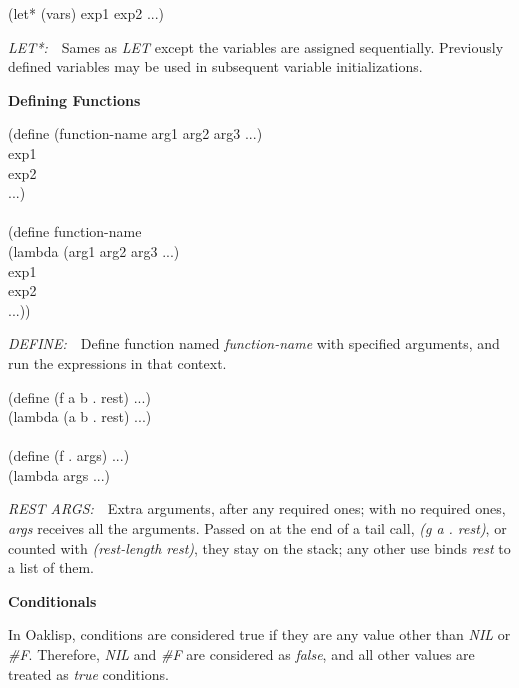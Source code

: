 \documentclass[12pt]{article}
\begin{document}
\parbox[t]{3.4in}{
(let* (vars)  exp1 exp2 ...)
}\parbox[t]{3.5in}{
 \emph{LET*:}\ \ Sames as \emph{LET} except the variables are assigned sequentially.  Previously defined variables may be used in subsequent variable initializations.
}


\newpage

{\Large \bfseries Defining Functions}

\bigskip


\parbox[t]{3.4in}{
(define (function-name arg1 arg2 arg3 ...)\\
\hspace*{4em}    exp1\\
\hspace*{4em}    exp2\\
\hspace*{4em}    ...)\\
\\
(define function-name\\
\hspace*{4em}(lambda (arg1 arg2 arg3 ...)\\
\hspace*{4em}    exp1\\
\hspace*{4em}    exp2\\
\hspace*{4em}    ...))
}\parbox[t]{3.5in}{
 \emph{DEFINE:}\ \ Define function named \emph{function-name} with specified arguments, and run the expressions in that context.
}

\bigskip

\parbox[t]{3.4in}{
(define (f a b . rest) ...)\\
(lambda (a b . rest) ...)\\
\\
(define (f . args) ...)\\
(lambda args ...)
}\parbox[t]{3.5in}{
 \emph{REST ARGS:}\ \ Extra arguments, after any required ones; with no required ones, \emph{args} receives all the arguments.  Passed on at the end of a tail call, \emph{(g a . rest)}, or counted with \emph{(rest-length rest)}, they stay on the stack; any other use binds \emph{rest} to a list of them.
}

\bigskip

{\Large \bfseries Conditionals}

\smallskip

In Oaklisp, conditions are considered true if they are any value other
than \emph{NIL} or \emph{\#F}.  Therefore, \emph{NIL} and \emph{\#F} are considered as \emph{false},
and all other values are treated as \emph{true} conditions.
\end{document}
